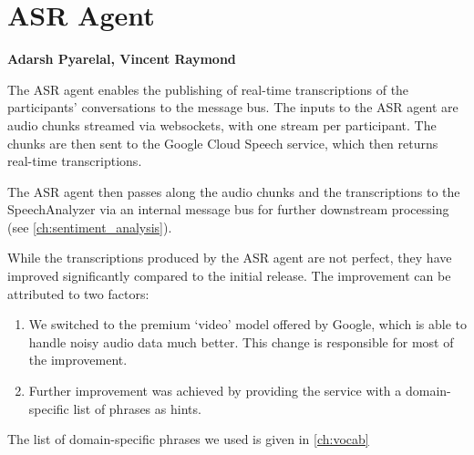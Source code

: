 \chapter{ASR Agent}
\label{ch:asr}
\textbf{Adarsh Pyarelal, Vincent Raymond}

The ASR agent enables the publishing of real-time transcriptions of the
participants' conversations to the message bus. The inputs to the ASR agent are
audio chunks streamed via websockets, with one stream per participant. The
chunks are then sent to the Google Cloud Speech service, which then returns
real-time transcriptions.

The ASR agent then passes along the audio chunks and the transcriptions to the
SpeechAnalyzer via an internal message bus for further downstream processing
(see \autoref{ch:sentiment_analysis}).

While the transcriptions produced by the ASR agent are not perfect, they have
improved significantly compared to the initial release. The improvement can be
attributed to two factors:

\begin{enumerate}
    \item We switched to the premium `video' model offered by Google, which is
        able to handle noisy audio data much better. This change is responsible
        for most of the improvement.
    \item Further improvement was achieved by providing the service with a
        domain-specific list of phrases as hints.
\end{enumerate}

The list of domain-specific phrases we used is given in \autoref{ch:vocab}
